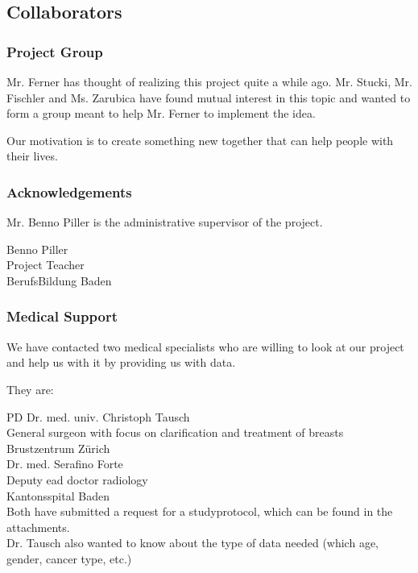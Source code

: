 \subsection{Collaborators}
\subsubsection{Project Group}
Mr. Ferner has thought of realizing this project quite a while ago.
Mr. Stucki, Mr. Fischler and Ms. Zarubica have found mutual interest in this topic and wanted to form a group meant to help Mr. Ferner to implement the idea.

Our motivation is to create something new together that can help people with their lives. 

\subsubsection{Acknowledgements}
Mr. Benno Piller is the administrative supervisor of the project.

Benno Piller\\
Project Teacher\\
BerufsBildung Baden

\subsubsection{Medical Support}

We have contacted two medical specialists who are willing to look at our project and help us with it by providing us with data.

They are:

PD Dr. med. univ. Christoph Tausch\\
General surgeon with focus on clarification and treatment of breasts\\
Brustzentrum Zürich\\


Dr. med. Serafino Forte\\
Deputy ead doctor radiology\\
Kantonsspital Baden\\

Both have submitted a request for a studyprotocol, which can be found in the attachments. \\
Dr. Tausch also wanted to know about the type of data needed (which age, gender, cancer type, etc.)